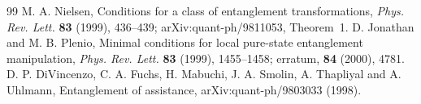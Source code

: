 \begin{thebibliography}{99}
 M. A. Nielsen,
Conditions for a class of entanglement transformations,
\emph{Phys. Rev. Lett.} \textbf{83} (1999), 436--439;
arXiv:quant-ph/9811053, Theorem~1.
 D. Jonathan and M. B. Plenio,
Minimal conditions for local pure-state entanglement manipulation,
\emph{Phys. Rev. Lett.} \textbf{83} (1999), 1455--1458;
erratum, \textbf{84} (2000), 4781.
 D. P. DiVincenzo, C. A. Fuchs, H. Mabuchi,
J. A. Smolin, A. Thapliyal and A. Uhlmann,
Entanglement of assistance, arXiv:quant-ph/9803033 (1998).
\end{thebibliography}
